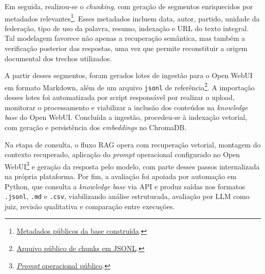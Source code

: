 Em seguida, realizou-se o \textit{chunking}, com geração de segmentos enriquecidos por metadados relevantes\footnote{\href{https://github.com/fabriciosantana/mcdia/blob/main/05-iag/4-project/knowledge_openwebui/build_metadata.json}{Metadados públicos da base construída}.}. Esses metadados incluem data, autor, partido, unidade da federação, tipo de uso da palavra, resumo, indexação e URL do texto integral. Tal modelagem favorece não apenas a recuperação semântica, mas também a verificação posterior das respostas, uma vez que permite reconstituir a origem documental dos trechos utilizados.

A partir desses segmentos, foram gerados lotes de ingestão para o Open WebUI em formato Markdown, além de um arquivo \texttt{jsonl} de referência\footnote{\href{https://github.com/fabriciosantana/mcdia/blob/main/05-iag/4-project/knowledge_openwebui/discursos_chunks.jsonl}{Arquivo público de chunks em JSONL}.}. A importação desses lotes foi automatizada por script responsável por realizar o upload, monitorar o processamento e viabilizar a inclusão dos conteúdos na \textit{knowledge base} do Open WebUI. Concluída a ingestão, procedeu-se à indexação vetorial, com geração e persistência dos \textit{embeddings} no ChromaDB.

Na etapa de consulta, o fluxo RAG opera com recuperação vetorial, montagem do contexto recuperado, aplicação do \textit{prompt} operacional configurado no Open WebUI\footnote{\href{https://github.com/fabriciosantana/mcdia/blob/main/05-iag/4-project/eval/prompts/rag_prompt.md}{\textit{Prompt} operacional público}.} e geração da resposta pelo modelo, com parte desses passos internalizada na própria plataforma. Por fim, a avaliação foi apoiada por automação em Python, que consulta a \textit{knowledge base} via API e produz saídas nos formatos \texttt{.jsonl}, \texttt{.md} e \texttt{.csv}, viabilizando análise estruturada, avaliação por LLM como juiz, revisão qualitativa e comparação entre execuções.

